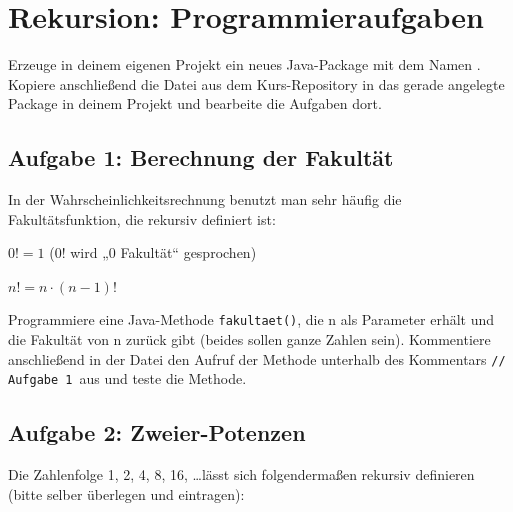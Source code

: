 \clearpage

\rehead[]{\textcolor{lightblue}{AvHG, Inf, My}}
\lohead[]{\textcolor{lightblue}{AvHG, Inf, My}}

\section{Rekursion: Programmieraufgaben}

Erzeuge in deinem eigenen Projekt ein neues Java-Package mit dem Namen
. Kopiere anschließend die Datei 
aus dem Kurs-Repository in das gerade angelegte Package in deinem Projekt und bearbeite
die Aufgaben dort.

\subsection{Aufgabe 1: Berechnung der Fakultät}

In der Wahrscheinlichkeitsrechnung benutzt man sehr häufig die Fakultätsfunktion, die rekursiv definiert ist:

$0! = 1$ \hspace{2cm}		(0! wird „0 Fakultät“ gesprochen)

$n! = n \cdot (n-1)!$

Programmiere eine Java-Methode \lstinline|fakultaet()|, die n als Parameter
erhält und die Fakultät von n zurück gibt (beides sollen ganze Zahlen sein).
Kommentiere anschließend in der Datei den Aufruf der Methode unterhalb des
Kommentars \glqq\lstinline|// Aufgabe 1|\grqq\ aus und teste die Methode.


\subsection{Aufgabe 2: Zweier-Potenzen}

Die Zahlenfolge 1, 2, 4, 8, 16, \ldots lässt sich folgendermaßen rekursiv
definieren (bitte selber überlegen und eintragen):

